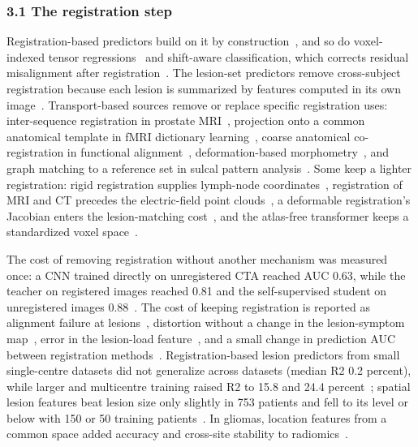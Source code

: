 \documentclass[journal,onecolumn]{IEEEtran}
\begin{document}
\subsubsection{3.1 The registration step}

Registration-based predictors build on it by construction~\cite{Bates2003Voxel,Bowren2022Poststroke,Brzus2026Clinical,Bonkhoff2024Prediction,Sperber2023Stroke,Liu2023Coordinatized,Choi2026Tumor,Fujibayashi2021Nonlinear}, and so do voxel-indexed tensor regressions~\cite{Zhou2013Tensor,Guhaniyogi2017Bayesian,Li2017Parsimonious,Zhang2017Envelope,Spencer2024Bayesian} and shift-aware classification, which corrects residual misalignment after registration~\cite{Huang2026ShiftAware}. The lesion-set predictors remove cross-subject registration because each lesion is summarized by features computed in its own image~\cite{Chen2021AMINN,Prabhakar2023Selfpruning,Wilk2025Towards,Geady2025Radiomic,Alberb2026Automated,Diao2024Multi,Xu2024Hybrid,Sabouri2025Enhancing}. Transport-based sources remove or replace specific registration uses: inter-sequence registration in prostate MRI~\cite{Gong2026Robust}, projection onto a common anatomical template in fMRI dictionary learning~\cite{Mazelet2026Learning}, coarse anatomical co-registration in functional alignment~\cite{Thual2022Aligning}, deformation-based morphometry~\cite{Kundu2018Discovery}, and graph matching to a reference set in sulcal pattern analysis~\cite{Kwon2025Graph}. Some keep a lighter registration: rigid registration supplies lymph-node coordinates~\cite{Karimzadeh2026Revisiting}, registration of MRI and CT precedes the electric-field point clouds~\cite{Liu2026Three}, a deformable registration's Jacobian enters the lesion-matching cost~\cite{Qahqaie2026Unbalanced}, and the atlas-free transformer keeps a standardized voxel space~\cite{Huang2026Atlas}.

The cost of removing registration without another mechanism was measured once: a CNN trained directly on unregistered CTA reached AUC 0.63, while the teacher on registered images reached 0.81 and the self-supervised student on unregistered images 0.88~\cite{Dong2024Self}. The cost of keeping registration is reported as alignment failure at lesions~\cite{Brett2001Spatial,Miller2025Comparison,Mok2022Unsupervised}, distortion without a change in the lesion-symptom map~\cite{Juhling2024Spatial}, error in the lesion-load feature~\cite{Seghier2023Elusive}, and a small change in prediction AUC between registration methods~\cite{Choi2026Tumor}. Registration-based lesion predictors from small single-centre datasets did not generalize across datasets (median R2 0.2 percent), while larger and multicentre training raised R2 to 15.8 and 24.4 percent~\cite{Bonkhoff2024Prediction}; spatial lesion features beat lesion size only slightly in 753 patients and fell to its level or below with 150 or 50 training patients~\cite{Sperber2023Stroke}. In gliomas, location features from a common space added accuracy and cross-site stability to radiomics~\cite{Liu2023Coordinatized}.
\end{document}
